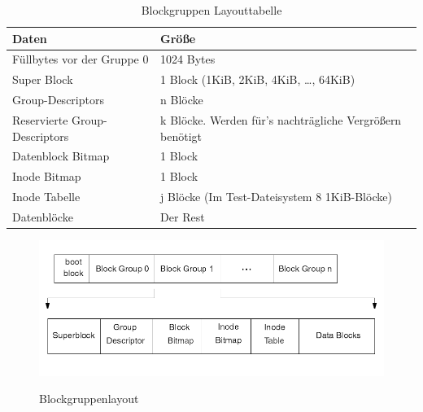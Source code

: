 \documentclass[11pt,a4paper]{article}
\begin{document}
\begin{table}[h]
	\begin{center}
		\begin{tabular}[c]{| l | l |}
			\hline
			\cellcolor{grey} Daten & \cellcolor{grey} Größe \\ \hline
			Füllbytes vor der Gruppe 0 & 1024 Bytes \\ \hline
			Super Block & 1 Block (1KiB, 2KiB, 4KiB, \ldots, 64KiB) \\ \hline
			Group-Descriptors & n Blöcke  \\ \hline
			Reservierte Group-Descriptors & k Blöcke. Werden für's nachträgliche Vergrößern benötigt \\ \hline
			Datenblock Bitmap & 1 Block \\ \hline
			Inode Bitmap & 1 Block \\ \hline
			Inode Tabelle & j Blöcke (Im Test-Dateisystem 8 1KiB-Blöcke) \\ \hline
			Datenblöcke & Der Rest \\ \hline
		
		\end{tabular}
	\end{center}

	\caption{Blockgruppen Layouttabelle}
	\label{tab:block_layout}
\end{table}

\begin{figure}[h]
	\centering
	\caption{Blockgruppenlayout}
	\includegraphics[scale=0.4]{images/block_group_layout.png}
	\label{fig:block_group}
\end{figure}
\end{document}
